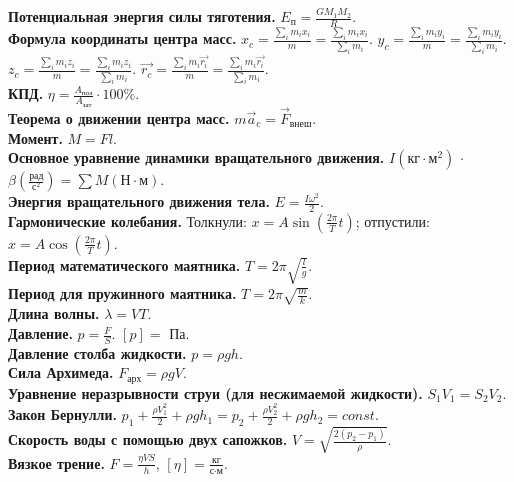 \documentclass[12pt]{article}
\begin{document}
	\textbf{Потенциальная энергия силы тяготения.}
	$E_{\text{п}} = \frac{GM_1M_2}{R}$.\\
	\textbf{Формула координаты центра масс.} $x_c = \frac{\sum\limits_i m_i x_i}{m} = \frac{\sum\limits_i m_i x_i}{\sum\limits_i m_i}$. $y_c = \frac{\sum\limits_i m_i y_i}{m} = \frac{\sum\limits_i m_i y_i}{\sum\limits_i m_i}$. $z_c = \frac{\sum\limits_i m_i z_i}{m} = \frac{\sum\limits_i m_i z_i}{\sum\limits_i m_i}$. $\vec{r_c} = \frac{\sum\limits_i m_i \vec{r_i}}{m} = \frac{\sum\limits_i m_i \vec{r_i}}{\sum\limits_i m_i}$.\\
	\textbf{КПД.} $\eta = \frac{A_{\text{пол}}}{A_{\text{зат}}} \cdot 100\%$.\\
	\textbf{Теорема о движении центра масс.} $m \vec{a}_c = \vec{F}_{\text{внеш}}$.\\
	\textbf{Момент.} $M = Fl$.\\
	\textbf{Основное уравнение динамики вращательного движения.} $I (\text{кг} \cdot \text{м}^2)$ $\cdot$ $\beta (\frac{\text{рад}}{\text{с}^2}) = \sum M (\text{Н} \cdot \text{м})$.\\
	\textbf{Энергия вращательного движения тела.} $E = \frac{I\omega^2}{2}$.\\
	\textbf{Гармонические колебания.} Толкнули: $x = A \sin (\frac{2\pi}{T} t)$; отпустили: $x = A \cos (\frac{2\pi}{T} t)$.\\
	\textbf{Период математического маятника.} $T = 2\pi\sqrt{\frac{l}{g}}$.\\
	\textbf{Период для пружинного маятника.} $T = 2\pi\sqrt{\frac{m}{k}}$.\\
	\textbf{Длина волны.} $\lambda = VT$.\\
	\textbf{Давление.} $p = \frac{F}{S}$. $[p] =$ Па.\\
	\textbf{Давление столба жидкости.} $p = \rho g h$.\\
	\textbf{Сила Архимеда.} $F_{\text{арх}} = \rho g V$.\\
	\textbf{Уравнение неразрывности струи (для несжимаемой жидкости).} $S_1V_1 = S_2V_2$.\\
	\textbf{Закон Бернулли.} $p_1 + \frac{\rho V_1^2}{2} + \rho g h_1 = p_2 + \frac{\rho V_2^2}{2} + \rho g h_2 = const$.\\
	\textbf{Скорость воды с помощью двух сапожков.} $V = \sqrt{\frac{2(p_2 - p_1)}{\rho}}$.\\
	\textbf{Вязкое трение.}	$F = \frac{\eta V S}{h}$, $[\eta] = \frac{\text{кг}}{\text{с} \cdot \text{м}}$.
\end{document}
